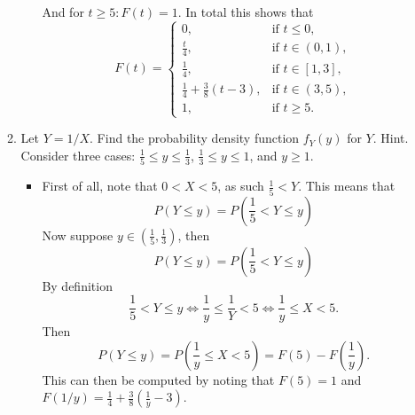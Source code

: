 \documentclass{article}
\begin{document}
\begin{enumerate}
\begin{enumerate}
\begin{itemize}
$$					$$
					And for $t \geq 5 : F(t) = 1$. In total this shows that
					$$
					F(t) = 
					\begin{cases} 
					0, & \text{if } t \leq 0, \\
					\frac{t}{4}, & \text{if } t \in (0, 1), \\
					\frac{1}{4}, & \text{if } t \in [1, 3], \\
					\frac{1}{4} + \frac{3}{8}(t - 3), & \text{if } t \in (3, 5), \\
					1, & \text{if } t \geq 5.
					\end{cases}
					$$
				\end{itemize}
			\item Let $Y = 1 / X$. Find the probability density function $f_Y(y)$ for $Y$. Hint. Consider three cases: $\frac{1}{5} \leq y \leq \frac{1}{3}$, $\frac{1}{3} \leq y \leq 1$, and $y \geq 1$.
				\begin{itemize}
					\item First of all, note that $0 < X < 5$, as such $\frac{1}{5} < Y$. This means that
					$$
					P(Y \leq y) = P\left(\frac{1}{5} < Y \leq y \right)
					$$
					Now suppose $y \in \left(\frac{1}{5}, \frac{1}{3} \right)$, then
					$$
					P\left(Y \leq y\right) = P\left( \frac{1}{5} < Y \leq y \right)
					$$
					By definition
					$$
					\frac{1}{5} < Y \leq y \iff \frac{1}{y} \leq \frac{1}{Y} < 5 \iff \frac{1}{y} \leq X < 5.
					$$
					Then
					$$
					P\left(Y \leq y\right) = P\left(\frac{1}{y} \leq X < 5\right) = F(5) - F\left( \frac{1}{y} \right).
					$$
					This can then be computed by noting that $F(5) = 1$ and $F(1 / y) = \frac{1}{4} + \frac{3}{8}(\frac{1}{y} - 3)$.


\end{itemize}
\end{enumerate}
\end{enumerate}
\end{document}
